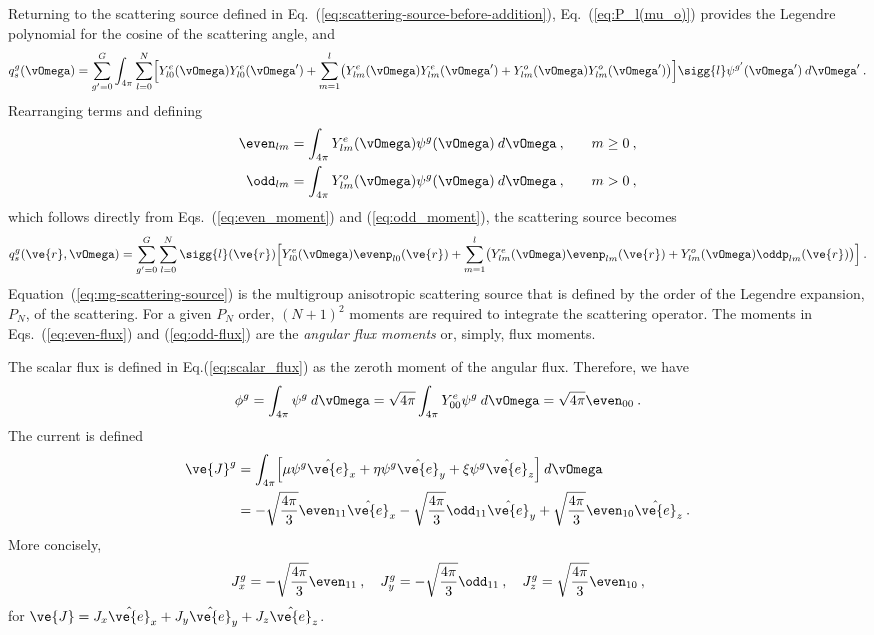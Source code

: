\documentclass{article}
\numberwithin{equation}{subsection}
\begin{document}
Returning to the scattering source defined in
Eq.~(\ref{eq:scattering-source-before-addition}), Eq.~(\ref{eq:P_l(mu_o)})
provides the Legendre polynomial for the cosine of the scattering angle, and
\begin{equation}
    q^g_{s}(\vOmega) = \sum_{g'=0}^G \int_{4\pi}
    \sum_{l=0}^N
    \Bigl[Y^e_{l0}(\vOmega)Y^e_{l0}(\vOmega')
    +\sum_{m=1}^l
    \bigl(Y^e_{lm}(\vOmega)Y^e_{lm}(\vOmega') +
    Y^o_{lm}(\vOmega)Y^o_{lm}(\vOmega')\bigr)\Bigr]
    \sigg{l}
    \psi^{g'}(\vOmega')\:d\vOmega'\:.
\end{equation}
Rearranging terms and defining
\begin{alignat}{3}
  \even_{lm} &= \int_{4\pi}Y^e_{lm}(\vOmega)\psi^g(\vOmega)\:d\vOmega\:,
  \quad& m\ge 0\:,\label{eq:even-flux}\\
  \odd_{lm} &= \int_{4\pi}Y^o_{lm}(\vOmega)\psi^g(\vOmega)\:d\vOmega\:,
  \quad& m>0\:,\label{eq:odd-flux}
\end{alignat}
which follows directly from Eqs.~(\ref{eq:even_moment}) and
(\ref{eq:odd_moment}), the scattering source becomes
\begin{equation}
  q^g_{s}(\ve{r},\vOmega) = \sum_{g'=0}^G
  \sum_{l=0}^N
  \sigg{l}(\ve{r})
  \Bigl[
  Y^e_{l0}(\vOmega)\evenp_{l0}(\ve{r}) +
  \sum_{m=1}^l
  \bigl(
  Y^e_{lm}(\vOmega)\evenp_{lm}(\ve{r}) +
  Y^o_{lm}(\vOmega)\oddp_{lm}(\ve{r})
  \bigr)\Bigr]\:.
  \label{eq:mg-scattering-source}
\end{equation}
Equation~(\ref{eq:mg-scattering-source}) is the multigroup anisotropic
scattering source that is defined by the order of the Legendre expansion,
$P_N$, of the scattering.  For a given $P_N$ order, $(N+1)^2$ moments are
required to integrate the scattering operator.  The moments in
Eqs.~(\ref{eq:even-flux}) and (\ref{eq:odd-flux}) are the \textit{angular flux
  moments} or, simply, flux moments.

The scalar flux is defined in Eq.(\ref{eq:scalar_flux}) as the zeroth moment
of the angular flux.  Therefore, we have
\begin{equation}
  \phi^g = \int_{4\pi}\psi^g\:d\vOmega = \sqrt{4\pi}\int_{4\pi}Y^e_{00}
  \psi^g\:d\vOmega = \sqrt{4\pi}\even_{00}\:.
\end{equation}
The current is defined
\begin{equation}
  \begin{split}
    \ve{J}^g &= \int_{4\pi}\Bigl[\mu\psi^g\hat{\ve{e}}_x +
    \eta\psi^g\hat{\ve{e}}_y +
    \xi\psi^g\hat{\ve{e}}_z\Bigr]\:d\vOmega\\
    &=-\sqrt{\frac{4\pi}{3}}\even_{11}\hat{\ve{e}}_x -
    \sqrt{\frac{4\pi}{3}}\odd_{11}\hat{\ve{e}}_y +
    \sqrt{\frac{4\pi}{3}}\even_{10}\hat{\ve{e}}_z\:.
  \end{split}
\end{equation}
More concisely,
\begin{equation}
  J_x^g = -\sqrt{\frac{4\pi}{3}}\even_{11}\:,\quad
  J_y^g = -\sqrt{\frac{4\pi}{3}}\odd_{11}\:,\quad
  J_z^g = \sqrt{\frac{4\pi}{3}}\even_{10}\:,
\end{equation}
for $\ve{J}= J_x\hat{\ve{e}}_x + J_y\hat{\ve{e}}_y
+J_z\hat{\ve{e}}_z$.
\end{document}
